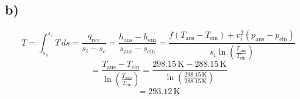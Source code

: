 

\subsection*{b)}
\[
T = \int_{s_a}^{s_e} T \, ds = \frac{q_{\text{rev}}}{s_i - s_e} = \frac{h_{\text{aus}} - h_{\text{ein}}}{s_{\text{aus}} - s_{\text{ein}}} = \frac{f (T_{\text{aus}} - T_{\text{ein}}) + v_i^2 (p_{\text{aus}} - p_{\text{ein}})}{s_i \ln \left( \frac{T_{\text{aus}}}{T_{\text{ein}}} \right)}
\]
\[
= \frac{T_{\text{aus}} - T_{\text{ein}}}{\ln \left( \frac{T_{\text{aus}}}{T_{\text{ein}}} \right)} = \frac{298.15 \, \text{K} - 288.15 \, \text{K}}{\ln \left( \frac{298.15 \, \text{K}}{288.15 \, \text{K}} \right)}
\]
\[
= 293.12 \, \text{K}
\]